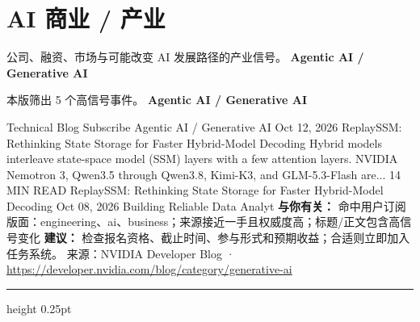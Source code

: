 \documentclass[10.5pt]{ctexart}
\begin{document}
\section*{AI 商业 / 产业}
{\color{ormuted} 公司、融资、市场与可能改变 AI 发展路径的产业信号。}
\vspace{2mm}
{\LARGE\bfseries Agentic AI / Generative AI}\par
\vspace{1mm}
{\color{ormuted} 本版筛出 5 个高信号事件。}
\vspace{3mm}
{\Large\bfseries Agentic AI / Generative AI}\par
Technical Blog Subscribe Agentic AI / Generative AI Oct 12, 2026 ReplaySSM: Rethinking State Storage for Faster Hybrid-Model Decoding Hybrid models interleave state-space model (SSM) layers with a few attention layers. NVIDIA Nemotron 3, Qwen3.5 through Qwen3.8, Kimi-K3, and GLM-5.3-Flash are... 14 MIN READ ReplaySSM: Rethinking State Storage for Faster Hybrid-Model Decoding Oct 08, 2026 Building Reliable Data Analyt
\textbf{与你有关：} 命中用户订阅版面：engineering、ai、business；来源接近一手且权威度高；标题/正文包含高信号变化
\textbf{建议：} 检查报名资格、截止时间、参与形式和预期收益；合适则立即加入任务系统。
{\footnotesize\color{ormuted} 来源：NVIDIA Developer Blog · \url{https://developer.nvidia.com/blog/category/generative-ai}}
\vspace{4mm}
\hrule height 0.25pt
\vspace{3mm}
\end{document}
